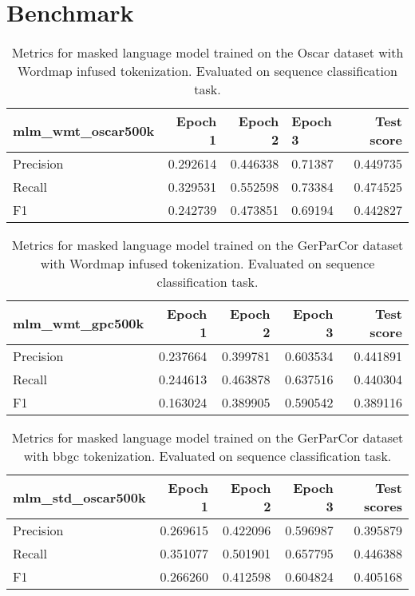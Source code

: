 \section{Benchmark}
\label{sec:benchmark}

\begin{table}
    \centering
    \begin{tabular}{lrrlr}
        \toprule
        \textbf{mlm\_wmt\_oscar500k} & \textbf{Epoch 1} & \textbf{Epoch 2} & \textbf{Epoch 3} & \textbf{Test score} \\
        \midrule
        Precision & 0.292614 & 0.446338 & 0.71387 & 0.449735 \\
        Recall & 0.329531 & 0.552598 & 0.73384 & 0.474525 \\
        F1 & 0.242739 & 0.473851 & 0.69194 & 0.442827 \\
        \bottomrule
    \end{tabular}
    \caption{Metrics for masked language model trained on the Oscar dataset with Wordmap infused  tokenization. Evaluated on sequence classification task.}
    \label{tab:mlm-wmt-oscar500k}
\end{table}


\begin{table}
    \centering
    \begin{tabular}{lrrrr}
        \toprule
        \textbf{mlm\_wmt\_gpc500k} & \textbf{Epoch 1} & \textbf{Epoch 2} & \textbf{Epoch 3} & \textbf{Test score} \\
        \midrule
        Precision & 0.237664 & 0.399781 & 0.603534 & 0.441891 \\
        Recall & 0.244613 & 0.463878 & 0.637516 & 0.440304 \\
        F1 & 0.163024 & 0.389905 & 0.590542 & 0.389116 \\
        \bottomrule
    \end{tabular}
    \caption{Metrics for masked language model trained on the GerParCor dataset with Wordmap infused tokenization. Evaluated on sequence classification task.}
    \label{tab:mlm-wmt-gpc500k}
\end{table}

\begin{table}
    \centering
    \begin{tabular}{lrrrr}
        \toprule
        \textbf{mlm\_std\_oscar500k} & \textbf{Epoch 1} & \textbf{Epoch 2} & \textbf{Epoch 3} & \textbf{Test scores} \\
        \midrule
        Precision & 0.269615 & 0.422096 & 0.596987 & 0.395879 \\
        Recall & 0.351077 & 0.501901 & 0.657795 & 0.446388 \\
        F1 & 0.266260 & 0.412598 & 0.604824 & 0.405168 \\
        \bottomrule
    \end{tabular}
    \caption{Metrics for masked language model trained on the GerParCor dataset with \ac{bbgc} tokenization. Evaluated on sequence classification task.}
    \label{tab:mlm-std-oscar500k}
\end{table}

